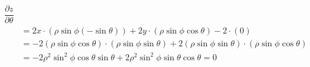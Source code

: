 \begin{enumerate}[leftmargin=0pt]
\begin{enumerate}
\begin{red}
\begin{align*}
            \dfrac{\partial z}{\partial\theta} \\
            &= 2x\cdot(\rho\sin\phi(-\sin\theta)) 
            + 2y\cdot(\rho\sin\phi\cos\theta)
            -2 \cdot (0) \\
            &= -2(\rho\sin\phi\cos\theta)\cdot(\rho\sin\phi\sin\theta) 
            +2(\rho\sin\phi\sin\theta)\cdot(\rho\sin\phi\cos\theta) \\
            &= -2\rho^2\sin^2\phi\cos\theta\sin\theta + 2\rho^2\sin^2\phi\sin\theta\cos\theta = 0
        \end{align*}
        \end{red}
    \end{enumerate}
\end{enumerate}

